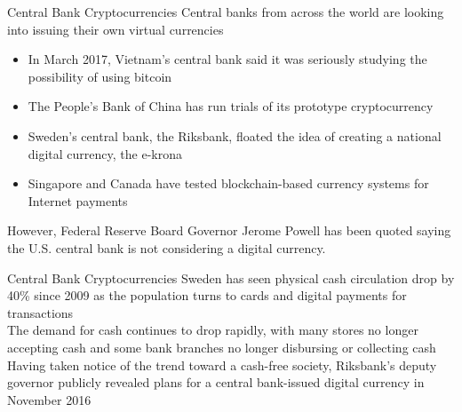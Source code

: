 \documentclass[11pt]{beamer}
\begin{document}
\begin{frame}{Central Bank Cryptocurrencies}
	Central banks from across the world are looking into issuing their own virtual currencies
	\begin{itemize}
		\item In March 2017, Vietnam's central bank said it was seriously studying the possibility of using bitcoin
		\item The People's Bank of China has run trials of its prototype cryptocurrency
		\item Sweden's central bank, the Riksbank, floated the idea of creating a national digital currency, the e-krona
		\item Singapore and Canada have tested blockchain-based currency systems for Internet payments
	\end{itemize}
	However, Federal Reserve Board Governor Jerome Powell has been quoted saying the U.S. central bank is not considering a digital currency.
\end{frame}


\begin{frame}{Central Bank Cryptocurrencies}
	Sweden has seen physical cash circulation drop by 40\% since 2009 as the population turns to cards and digital payments for transactions\\ \vspace{3mm}
	The demand for cash continues to drop rapidly, with many stores no longer accepting cash and some bank branches no longer disbursing or collecting cash\\ \vspace{3mm}
	Having taken notice of the trend toward a cash-free society, Riksbank's deputy governor publicly revealed plans for a central bank-issued digital currency in November 2016\\ \vspace{3mm}
\end{frame}


\end{document}
